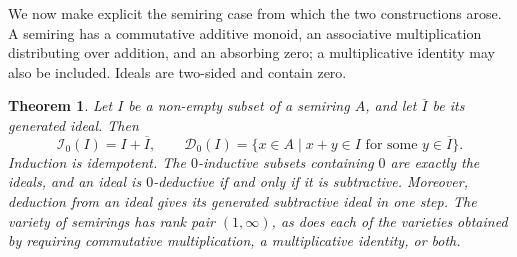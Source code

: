 \documentclass[12pt,english]{amsart}
\newtheorem{theorem}{Theorem}[section]
\theoremstyle{definition}
\numberwithin{equation}{section}
\theoremstyle{remark}
\begin{document}
We now make explicit the semiring case from which the two constructions arose. A semiring has a commutative additive monoid, an associative multiplication distributing over addition, and an absorbing zero; a multiplicative identity may also be included. Ideals are two-sided and contain zero.

\begin{theorem}\label{ThmD}
Let $I$ be a non-empty subset of a semiring $A$, and let $\overline I$ be its generated ideal. Then
\begin{equation}\label{EqSemiringOperators}
\mathcal I_0(I)=I+\overline I,
\qquad
\mathcal D_0(I)=\{x\in A\mid x+y\in I\text{ for some }y\in\overline I\}.
\end{equation}
Induction is idempotent. The $0$-inductive subsets containing $0$ are exactly the ideals, and an ideal is $0$-deductive if and only if it is subtractive. Moreover, deduction from an ideal gives its generated subtractive ideal in one step. The variety of semirings has rank pair $(1,\infty)$, as does each of the varieties obtained by requiring commutative multiplication, a multiplicative identity, or both.
\end{theorem}
\end{document}
